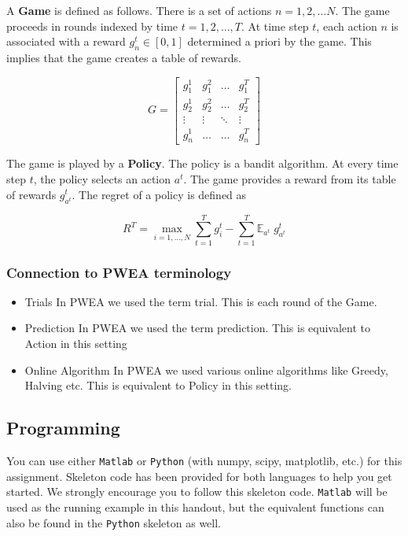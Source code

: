 \documentclass{article}
\newcommand{\E}[1]{\mathbb{E}_{#1}\;}
\begin{document}
A \textbf{Game} is defined as follows. There is a set of actions $n = 1, 2, \dots N$. The game proceeds in rounds indexed by time $t = 1, 2, \dots, T$. At time step $t$, each action $n$ is associated with a reward $g^t_n \in [0, 1]$ determined a priori by the game. This implies that the game creates a table of rewards.

\begin{equation}
G = 
\begin{bmatrix}
g^1_1 &  g^2_1  & \ldots & g^T_1\\
g^1_2 & g^2_2   & \ldots & g^T_2\\
\vdots & \vdots & \ddots & \vdots\\
g^1_n  & \ldots & \ldots & g^T_n
\end{bmatrix}
\end{equation}

The game is played by a \textbf{Policy}. The policy is a bandit algorithm. At every time step $t$, the policy selects an action $a^t$. The game provides a reward from its table of rewards $g^t_{a^t}$.
The regret of a policy is defined as 

\begin{equation}
R^{T} =  \max_{i=1,\dots,N} \sum\limits_{t=1}^T g^t_i - \sum\limits_{t=1}^T \E{a^t} g^t_{a^t}
\end{equation}

\subsubsection{Connection to PWEA terminology}
\begin{itemize}
\item Trials \textemdash In PWEA we used the term trial. This is each round of the Game.
\item Prediction \textemdash In PWEA we used the term prediction. This is equivalent to Action in this setting
\item Online Algorithm \textemdash In PWEA we used various online algorithms like Greedy, Halving etc. This is equivalent to Policy in this setting.
\end{itemize}

\subsection{Programming}

You can use either \texttt{Matlab} or \texttt{Python} (with numpy, scipy, matplotlib, etc.) for this assignment. Skeleton code has been provided for both languages to help you get started. We strongly encourage you to follow this skeleton code. \texttt{Matlab} will be used as the running example in this handout, but the equivalent functions can also be found in the \texttt{Python} skeleton as well.
\end{document}
